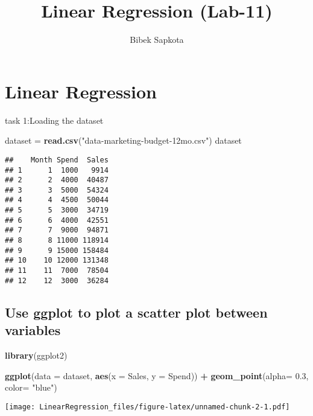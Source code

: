 \documentclass[
]{article}
\title{Linear Regression (Lab-11)}
\author{Bibek Sapkota}
\date{}
\newenvironment{Shaded}{\begin{snugshade}}{\end{snugshade}}
\newcommand{\AttributeTok}[1]{\textcolor[rgb]{0.13,0.29,0.53}{#1}}
\newcommand{\FloatTok}[1]{\textcolor[rgb]{0.00,0.00,0.81}{#1}}
\newcommand{\FunctionTok}[1]{\textcolor[rgb]{0.13,0.29,0.53}{\textbf{#1}}}
\newcommand{\NormalTok}[1]{#1}
\newcommand{\OtherTok}[1]{\textcolor[rgb]{0.56,0.35,0.01}{#1}}
\newcommand{\SpecialCharTok}[1]{\textcolor[rgb]{0.81,0.36,0.00}{\textbf{#1}}}
\newcommand{\StringTok}[1]{\textcolor[rgb]{0.31,0.60,0.02}{#1}}
\begin{document}
\maketitle

\hypertarget{linear-regression}{%
\section{Linear Regression}\label{linear-regression}}

task 1:Loading the dataset

\begin{Shaded}
\begin{Highlighting}[]
\NormalTok{dataset }\OtherTok{=} \FunctionTok{read.csv}\NormalTok{(}\StringTok{"data{-}marketing{-}budget{-}12mo.csv"}\NormalTok{)}
\NormalTok{dataset}
\end{Highlighting}
\end{Shaded}

\begin{verbatim}
##    Month Spend  Sales
## 1      1  1000   9914
## 2      2  4000  40487
## 3      3  5000  54324
## 4      4  4500  50044
## 5      5  3000  34719
## 6      6  4000  42551
## 7      7  9000  94871
## 8      8 11000 118914
## 9      9 15000 158484
## 10    10 12000 131348
## 11    11  7000  78504
## 12    12  3000  36284
\end{verbatim}

\hypertarget{use-ggplot-to-plot-a-scatter-plot-between-variables}{%
\subsection{Use ggplot to plot a scatter plot between
variables}\label{use-ggplot-to-plot-a-scatter-plot-between-variables}}

\begin{Shaded}
\begin{Highlighting}[]
\FunctionTok{library}\NormalTok{(ggplot2)}

\FunctionTok{ggplot}\NormalTok{(}\AttributeTok{data =}\NormalTok{ dataset, }\FunctionTok{aes}\NormalTok{(}\AttributeTok{x =}\NormalTok{ Sales, }\AttributeTok{y =}\NormalTok{ Spend)) }\SpecialCharTok{+} \FunctionTok{geom\_point}\NormalTok{(}\AttributeTok{alpha=} \FloatTok{0.3}\NormalTok{, }\AttributeTok{color=} \StringTok{"blue"}\NormalTok{) }
\end{Highlighting}
\end{Shaded}

\texttt{[image: LinearRegression\_files/figure-latex/unnamed-chunk-2-1.pdf]}
\end{document}
